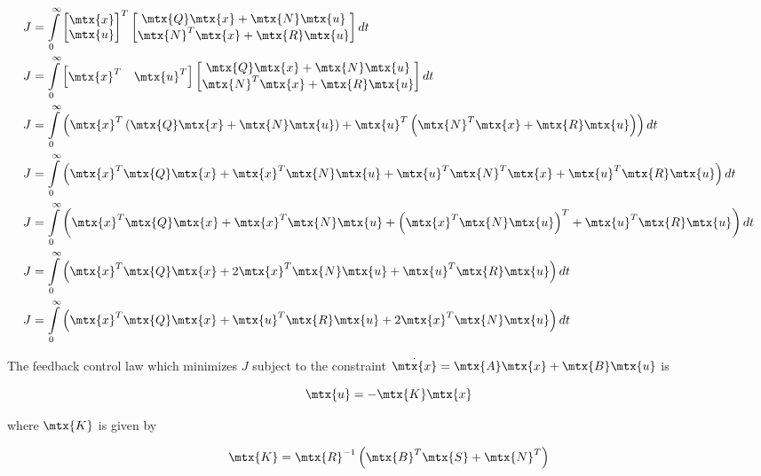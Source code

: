 \begin{align*}
  J &= \int\limits_0^\infty
    \begin{bmatrix}
      \mtx{x} \\
      \mtx{u}
    \end{bmatrix}^T
    \begin{bmatrix}
      \mtx{Q}\mtx{x} + \mtx{N}\mtx{u} \\
      \mtx{N}^T\mtx{x} + \mtx{R}\mtx{u}
    \end{bmatrix} dt \\
  J &= \int\limits_0^\infty
    \begin{bmatrix}
      \mtx{x}^T & \mtx{u}^T
    \end{bmatrix}
    \begin{bmatrix}
      \mtx{Q}\mtx{x} + \mtx{N}\mtx{u} \\
      \mtx{N}^T\mtx{x} + \mtx{R}\mtx{u}
    \end{bmatrix} dt \\
  J &= \int\limits_0^\infty
    \left(\mtx{x}^T\left(\mtx{Q}\mtx{x} + \mtx{N}\mtx{u}\right) +
      \mtx{u}^T\left(\mtx{N}^T\mtx{x} + \mtx{R}\mtx{u}\right)\right) dt \\
  J &= \int\limits_0^\infty
    \left(\mtx{x}^T\mtx{Q}\mtx{x} + \mtx{x}^T\mtx{N}\mtx{u} +
      \mtx{u}^T\mtx{N}^T\mtx{x} + \mtx{u}^T\mtx{R}\mtx{u}\right) dt \\
  J &= \int\limits_0^\infty
    \left(\mtx{x}^T\mtx{Q}\mtx{x} + \mtx{x}^T\mtx{N}\mtx{u} +
      \left(\mtx{x}^T\mtx{N}\mtx{u}\right)^T + \mtx{u}^T\mtx{R}\mtx{u}\right)
    dt \\
  J &= \int\limits_0^\infty
    \left(\mtx{x}^T\mtx{Q}\mtx{x} + 2\mtx{x}^T\mtx{N}\mtx{u} +
      \mtx{u}^T\mtx{R}\mtx{u}\right) dt \\
  J &= \int\limits_0^\infty
    \left(\mtx{x}^T\mtx{Q}\mtx{x} + \mtx{u}^T\mtx{R}\mtx{u} +
      2\mtx{x}^T\mtx{N}\mtx{u}\right) dt
\end{align*}

The feedback \gls{control law} which minimizes $J$ subject to the constraint
$\dot{\mtx{x}} = \mtx{A}\mtx{x} + \mtx{B}\mtx{u}$ is

\begin{equation*}
  \mtx{u} = -\mtx{K}\mtx{x}
\end{equation*}

where $\mtx{K}$ is given by

\begin{equation*}
  \mtx{K} = \mtx{R}^{-1} \left(\mtx{B}^T\mtx{S} + \mtx{N}^T\right)
\end{equation*}


